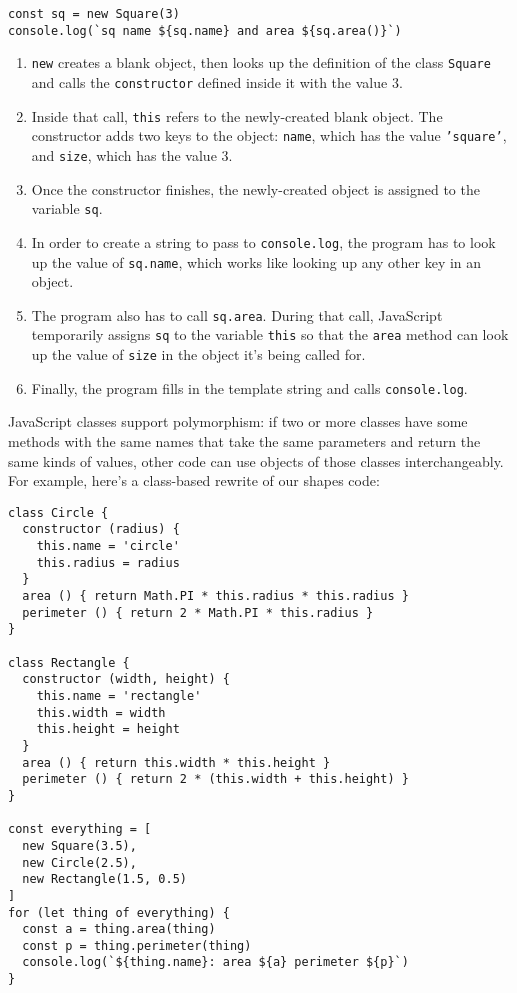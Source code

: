 \begin{verbatim}
const sq = new Square(3)
console.log(`sq name ${sq.name} and area ${sq.area()}`)
\end{verbatim}

\begin{enumerate}
\item
  \texttt{new} creates a blank object,
  then looks up the definition of the class \texttt{Square}
  and calls the \texttt{constructor} defined inside it
  with the value 3.
\item
  Inside that call,
  \texttt{this} refers to the newly-created blank object.
  The constructor adds two keys to the object:
  \texttt{name}, which has the value \texttt{'square'},
  and \texttt{size}, which has the value 3.
\item
  Once the constructor finishes,
  the newly-created object is assigned to the variable \texttt{sq}.
\item
  In order to create a string to pass to \texttt{console.log},
  the program has to look up the value of \texttt{sq.name},
  which works like looking up any other key in an object.
\item
  The program also has to call \texttt{sq.area}.
  During that call,
  JavaScript temporarily assigns \texttt{sq} to the variable \texttt{this}
  so that the \texttt{area} method can look up the value of \texttt{size}
  in the object it's being called for.
\item
  Finally,
  the program fills in the template string and calls \texttt{console.log}.
\end{enumerate}

JavaScript classes support polymorphism:
if two or more classes have some methods with the same names
that take the same parameters
and return the same kinds of values,
other code can use objects of those classes interchangeably.
For example,
here's a class-based rewrite of our shapes code:

\begin{verbatim}
class Circle {
  constructor (radius) {
    this.name = 'circle'
    this.radius = radius
  }
  area () { return Math.PI * this.radius * this.radius }
  perimeter () { return 2 * Math.PI * this.radius }
}

class Rectangle {
  constructor (width, height) {
    this.name = 'rectangle'
    this.width = width
    this.height = height
  }
  area () { return this.width * this.height }
  perimeter () { return 2 * (this.width + this.height) }
}

const everything = [
  new Square(3.5),
  new Circle(2.5),
  new Rectangle(1.5, 0.5)
]
for (let thing of everything) {
  const a = thing.area(thing)
  const p = thing.perimeter(thing)
  console.log(`${thing.name}: area ${a} perimeter ${p}`)
}
\end{verbatim}

